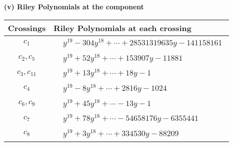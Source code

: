 \documentclass[1p]{elsarticle_modified}
\theoremstyle{definition}
\begin{document}
\newpage\renewcommand{\arraystretch}{1}
\flushleft \textbf{(v) Riley Polynomials at the component}\newline \\
\begin{tabular}{m{50pt}|m{274pt}}
Crossings & \hspace{64pt}Riley Polynomials at each crossing \\
\hline $$\begin{aligned}c_{1}\end{aligned}$$&$\begin{aligned}
&y^{19}-304 y^{18}+\cdots+28531319635 y-141158161
\end{aligned}$\\
\hline $$\begin{aligned}c_{2},c_{5}\end{aligned}$$&$\begin{aligned}
&y^{19}+52 y^{18}+\cdots+153907 y-11881
\end{aligned}$\\
\hline $$\begin{aligned}c_{3},c_{11}\end{aligned}$$&$\begin{aligned}
&y^{19}+13 y^{18}+\cdots+18 y-1
\end{aligned}$\\
\hline $$\begin{aligned}c_{4}\end{aligned}$$&$\begin{aligned}
&y^{19}-8 y^{18}+\cdots+2816 y-1024
\end{aligned}$\\
\hline $$\begin{aligned}c_{6},c_{9}\end{aligned}$$&$\begin{aligned}
&y^{19}+45 y^{18}+\cdots-13 y-1
\end{aligned}$\\
\hline $$\begin{aligned}c_{7}\end{aligned}$$&$\begin{aligned}
&y^{19}+78 y^{18}+\cdots-54658176 y-6355441
\end{aligned}$\\
\hline $$\begin{aligned}c_{8}\end{aligned}$$&$\begin{aligned}
&y^{19}+3 y^{18}+\cdots+334530 y-88209
\end{aligned}$\\

\end{tabular}
\end{document}
